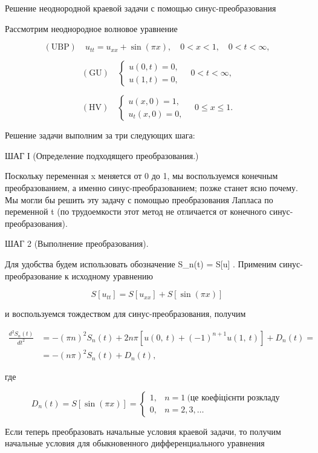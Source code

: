 \documentclass[
  ukrainian,
]{article}
\begin{document}
Решение неоднородной краевой задачи с помощью синус-преобразования

Рассмотрим неоднородное волновое уравнение

\[
(\text{UBP}) \quad u_{tt} = u_{xx} + \sin(\pi x), \quad 0 < x < 1, \quad 0 < t < \infty,
\]

\[
(\text{GU}) \quad \begin{cases} u(0, t) = 0, \\ u(1, t) = 0, \end{cases} \quad 0 < t < \infty,
\]

\[
(\text{HV}) \quad \begin{cases} u(x, 0) = 1, \\ u_t(x, 0) = 0, \end{cases} \quad 0 \leqslant x \leqslant 1.
\]

Решение задачи выполним за три следующих шага:

ШАГ І (Определение подходящего преобразования.)

Поскольку переменная x меняется от 0 до 1, мы воспользуемся конечным
преобразованием, а именно синус-преобразованием; позже станет ясно
почему. Мы могли бы решить эту задачу с помощью преобразования Лапласа
по переменной t (по трудоемкости этот метод не отличается от конечного
синус-преобразования).

ШАГ 2 (Выполнение преобразования).

Для удобства будем использовать обозначение S\_n(t) = S{[}u{]} .
Применим синус-преобразование к исходному уравнению

\[
S[u_{tt}] = S[u_{xx}] + S[\sin(\pi x)]
\]

и воспользуемся тождеством для синус-преобразования, получим

\[
\begin{split} \frac{d^2S_n\left(t\right)}{dt^2} &= -\left(\pi n\right)^2S_n\left(t\right) + 2n\pi\left[u\left(0,\ t\right) + \left(-1\right)^{n+1}u\left(1,\ t\right)\right] + D_n\left(t\right) = \\ &= -\left(n\pi\right)^2S_n\left(t\right) + D_n\left(t\right),  \end{split}
\]

где

\[
D_n(t) = S[\sin(\pi x)] = \begin{cases} 1, & n = 1 \ \text{(це коефіцієнти розкладу} \\0, &n = 2, 3, \dots \end{cases}
\]

Если теперь преобразовать начальные условия краевой задачи, то получим
начальные условия для обыкновенного дифференциального уравнения
\end{document}

